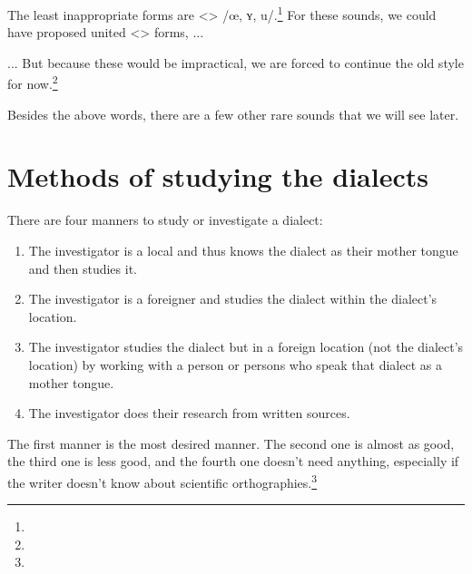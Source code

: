 The least inappropriate forms are <> /œ, ʏ, u/.\footnote{} For these sounds, we could have proposed united <> forms, ... 


\begin{adjarianpage}\label{page:11}\end{adjarianpage}%

... But because these would be impractical, we are forced to continue the old style for now.\footnote{} 

Besides the above words, there are a few other rare sounds that we will see later. 

\section{Methods of studying the dialects}

There are four manners to study or investigate a dialect:
\begin{enumerate}
	\item The investigator is a local and thus knows the dialect as their mother tongue and then studies it. 
	\item The investigator is a foreigner and studies the dialect within the dialect's location. 
	\item The investigator studies the dialect but in a foreign location (not the dialect's location) by working with a person or persons who speak that dialect as a mother tongue. 
	\item The investigator does their research from written sources. 
	
\end{enumerate}

The first manner is the most desired manner. The second one is almost as good, the third one is less good, and the fourth one doesn't need anything, especially if the writer doesn't know about scientific orthographies.\footnote{}

